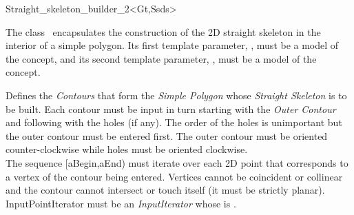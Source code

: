 

\begin{ccRefClass}{Straight_skeleton_builder_2<Gt,Ssds>}

\ccDefinition
The class \ccRefName\  encapsulates the construction of the 2D straight skeleton in the interior of a simple polygon. Its first template parameter, , must be a model of the  concept, and its second template parameter, , must be a model of the  concept.
 
\ccTypes
\ccGlue
\ccGlue

\ccCreation
{}


{Defines the \textit{Contours} that form the \textit{Simple Polygon} whose \textit{Straight Skeleton} is to be built. Each contour must be input in turn starting with the \textit{Outer Contour} and following with the holes (if any). The order of the holes is unimportant but the outer contour must be entered first. The outer contour must be oriented counter-clockwise while holes must be oriented clockwise.\\
The sequence [aBegin,aEnd) must iterate over each 2D point that corresponds to a vertex of the contour being entered. Vertices cannot be coincident or collinear and the contour cannot intersect or touch itself (it must be strictly planar).\\
InputPointIterator must be an \textit{InputIterator} whose  is .}
   

\end{ccRefClass}

